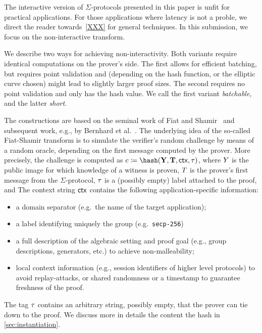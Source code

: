 \documentclass[runningheads]{llncs}
\begin{document}
\begin{remark}
The interactive version of $\Sigma$-protocols presented in this paper is unfit for practical applications. For those applications where latency is not a proble, we direct the reader towards~\cref{XXX} for general techniques. In this submission, we focus on the non-interactive transform.
\end{remark}


We describe two ways for achieving non-interactivity. Both variants require identical computations on the prover's side.
The first allows for efficient batching, but requires point validation and (depending on the hash function, or the elliptic curve chosen) might lead to
slightly larger proof sizes. The second requires no point validation and only has the hash value.
We call the first variant \emph{batchable}, and the latter \emph{short}.

The constructions are based on the seminal work of Fiat and Shamir~\cite{C:FiaSha86} and subsequent work, e.g., by Bernhard et al.~\cite{AC:BerPerWar12}.
The underlying idea of the so-called Fiat-Shamir transform is to simulate the verifier's random challenge by means of a random oracle, depending on the first message computed by the prover.
More precisely, the challenge is computed as
$c\defeq\hash(\vec \statement,\vec \commitment, \ctx, \stag)$,
where $Y$ is the public image for which knowledge of a witness is proven, $T$ is the prover's first message from the $\Sigma$-protocol, $\tau$ is a (possibly empty) label attached to the proof, and
The context string $\mathsf{ctx}$ contains the following application-specific information:
\begin{itemize}
  \item a domain separator (e.g.\ the name of the target application);
  \item a label identifying uniquely the group (e.g.\ \verb|secp-256|)
  \item
    a full description of the algebraic setting and proof goal (e.g., group descriptions, generators, etc.) to achieve non-malleability;
  \item
    local context information (e.g., session identifiers of higher level protocols) to avoid replay-attacks, or shared randomness or a timestamp to guarantee freshness of the proof.
\end{itemize}
The tag $\tau$ contains an arbitrary string, possibly empty, that the prover can tie down to the proof.
We discuss more in details the content the hash in \cref{sec:instantiation}.
\end{document}
